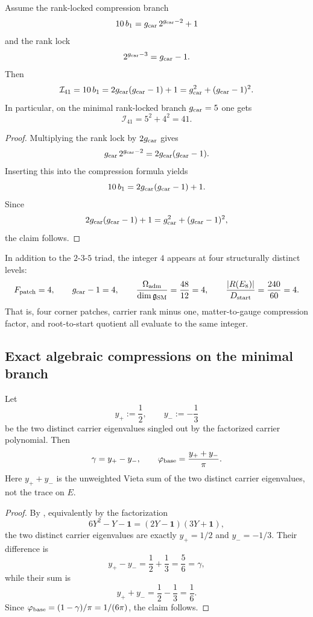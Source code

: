 \begin{corollary}
\label{cor:pythagorean-integrity-index}
Assume the rank-locked compression branch
\[
10\,b_1=g_{\mathrm{car}}\,2^{g_{\mathrm{car}}-2}+1
\]
and the rank lock
\[
2^{g_{\mathrm{car}}-3}=g_{\mathrm{car}}-1.
\]
Then
\[
\mathcal I_{41}
=
10\,b_1
=
2g_{\mathrm{car}}(g_{\mathrm{car}}-1)+1
=
g_{\mathrm{car}}^2+(g_{\mathrm{car}}-1)^2.
\]
In particular, on the minimal rank-locked branch $g_{\mathrm{car}}=5$ one gets
\[
\mathcal I_{41}=5^2+4^2=41.
\]
\end{corollary}

\begin{proof}
Multiplying the rank lock by $2g_{\mathrm{car}}$ gives
\[
g_{\mathrm{car}}\,2^{g_{\mathrm{car}}-2}=2g_{\mathrm{car}}(g_{\mathrm{car}}-1).
\]
Inserting this into the compression formula yields
\[
10\,b_1=2g_{\mathrm{car}}(g_{\mathrm{car}}-1)+1.
\]
Since
\[
2g_{\mathrm{car}}(g_{\mathrm{car}}-1)+1=g_{\mathrm{car}}^2+(g_{\mathrm{car}}-1)^2,
\]
the claim follows.
\end{proof}

\begin{remark}
In addition to the $2$-$3$-$5$ triad, the integer $4$ appears at four structurally distinct levels:
\[
F_{\mathrm{patch}}=4,
\qquad
g_{\mathrm{car}}-1=4,
\qquad
\frac{\Omega_{\mathrm{adm}}}{\dim\mathfrak g_{\mathrm{SM}}}=\frac{48}{12}=4,
\qquad
\frac{|R(E_8)|}{D_{\mathrm{start}}}=\frac{240}{60}=4.
\]
That is, four corner patches, carrier rank minus one, matter-to-gauge compression factor, and root-to-start quotient all evaluate to the same integer.
\end{remark}

\subsection{Exact algebraic compressions on the minimal branch}

\begin{corollary}
Let
\[
y_+:=\frac12,
\qquad
y_-:=-\frac13
\]
be the two distinct carrier eigenvalues singled out by the factorized carrier polynomial. Then
\[
\gamma=y_+-y_-,
\qquad
\varphi_{\mathrm{base}}=\frac{y_++y_-}{\pi}.
\]
Here $y_++y_-$ is the unweighted Vieta sum of the two distinct carrier eigenvalues, not the trace on $E$.
\end{corollary}

\begin{proof}
By , equivalently by the factorization
\[
6Y^2-Y-\mathbf 1=(2Y-\mathbf 1)(3Y+\mathbf 1),
\]
the two distinct carrier eigenvalues are exactly $y_+=1/2$ and $y_-=-1/3$. Their difference is
\[
y_+-y_-=\frac12+\frac13=\frac56=\gamma,
\]
while their sum is
\[
y_++y_-=\frac12-\frac13=\frac16.
\]
Since $\varphi_{\mathrm{base}}=(1-\gamma)/\pi=1/(6\pi)$, the claim follows.
\end{proof}

